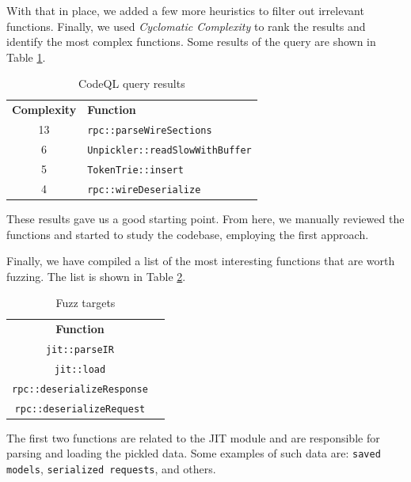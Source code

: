 With that in place, we added a few more heuristics to filter out irrelevant functions. Finally, we used \textit{Cyclomatic Complexity} \cite{cyclomatic-complexity-density} to rank the results and identify the most complex functions. Some results of the query are shown in Table \ref{table:codeql-results}.

\begin{table}[h]
    \centering
    \begin{tabular}{cl}
        \toprule
        \textbf{Complexity} & \textbf{Function}                      \\
        13                  & \texttt{rpc::parseWireSections}        \\
        6                   & \texttt{Unpickler::readSlowWithBuffer} \\
        5                   & \texttt{TokenTrie::insert}             \\
        4                   & \texttt{rpc::wireDeserialize}          \\
        \bottomrule
    \end{tabular}
    \caption{CodeQL query results}
    \label{table:codeql-results}
\end{table}

These results gave us a good starting point. From here, we manually reviewed the functions and started to study the codebase, employing the first approach.

Finally, we have compiled a list of the most interesting functions that are worth fuzzing. The list is shown in Table \ref{table:fuzz-targets}.

\begin{table}[h]
    \centering
    \begin{tabular}{cl}
        \toprule
        \textbf{Function}                 \\
        \texttt{jit::parseIR}             \\
        \texttt{jit::load}                \\
        \texttt{rpc::deserializeResponse} \\
        \texttt{rpc::deserializeRequest}  \\
        \bottomrule
    \end{tabular}
    \caption{Fuzz targets}
    \label{table:fuzz-targets}
\end{table}

The first two functions are related to the JIT module and are responsible for parsing and loading the pickled data. Some examples of such data are: \texttt{saved models}, \texttt{serialized requests}, and others.

